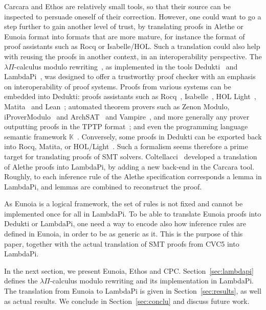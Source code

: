 \documentclass[class=llncs, crop=false]{standalone}
\begin{document}
Carcara and Ethos are relatively small tools, so that their source can
be inspected to persuade oneself of their correction. However, one
could want to go a step further to gain another level of trust, by
translating proofs in Alethe or Eunoia format into formats that are
more mature, for instance the format of proof assistants such as Rocq
or Isabelle/HOL. Such a translation could also help with reusing the
proofs in another context, in an interoperability perspective. The
$\lambda\Pi$-calculus modulo rewriting~\cite{CousineauDowek}, as
implemented in the tools Dedukti~\cite{assaf2023dedukti} and
LambdaPi~\cite{hondet:hal-02981561}, was designed to offer a
trustworthy proof checker with an emphasis on interoperability of
proof systems. Proofs from various systems can be embedded into
Dedukti: proofs assistants such as Rocq~\cite{boespflug12coqine},
Isabelle~\cite{isabelle_dedukti}, HOL Light~\cite{assaf15translating},
Matita~\cite{krajono} and Lean~\cite{vaishnav25lean4less}; automated
theorem provers such as Zenon Modulo, iProverModulo~\cite{burel20first} and ArchSAT~\cite{bury:tel-02612985} and
Vampire~\cite{komel2025case}, and more generally any prover outputting proofs in the TPTP
format~\cite{DBLP:conf/flairs/SutcliffeBB25}; and even the programming language semantic framework
\(\mathbb K\)~\cite{DBLP:conf/types/LedeinBD22}. Conversely, some proofs in Dedukti can be exported back into Rocq,
Matita, or HOL/Light~\cite{DBLP:journals/corr/abs-1807-01873}. Such a formalism seems therefore a prime target
for translating proofs of SMT solvers.
Coltellacci~\cite{coltellacciReconstructionSMTProofs2024a} developed a
translation of Alethe proofs into LambdaPi, by adding a new back-end
in the Carcara tool. Roughly, to each inference rule of the Alethe
specification corresponds a lemma in LambdaPi, and lemmas are combined
to reconstruct the proof.

As Eunoia is a logical framework, the set of rules is not fixed and
cannot be implemented once for all in LambdaPi. To be
able to translate Eunoia proofs into Dedukti or LambdaPi, one need a
way to encode also how inference rules are defined in Eunoia, in order
to be as generic as it. This is the purpose of this paper, together
with the actual translation of SMT proofs from CVC5 into LambdaPi.

In the next section, we present Eunoia, Ethos and
CPC. Section~\ref{sec:lambdapi} defines the $\lambda\Pi$-calculus
modulo rewriting and its implementation in LambdaPi. The translation
from Eunoia to LambdaPi is given in Section~\ref{sec:results}, as well
as actual results. We conclude in Section~\ref{sec:conclu} and discuss
future work.


%
\end{document}
